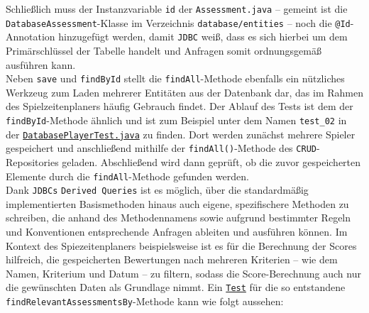 Schließlich muss der Instanzvariable \texttt{id} der 
\texttt{Assessment.java} -- gemeint ist die \linebreak \texttt{DatabaseAssessment}-Klasse 
im Verzeichnis \texttt{database/entities} -- noch die \texttt{@Id}-Annotation hinzugefügt 
werden, damit \texttt{JDBC} weiß, dass es sich hierbei um dem Primärschlüssel der 
Tabelle handelt und Anfragen somit ordnungsgemäß ausführen kann. \\ 
Neben \texttt{save} und \texttt{findById} stellt die \texttt{findAll}-Methode 
ebenfalls ein nützliches Werkzeug zum Laden mehrerer Entitäten aus der Datenbank dar, 
das im Rahmen des Spielzeitenplaners häufig Gebrauch findet. Der Ablauf des Tests 
ist dem der \texttt{findById}-Methode ähnlich und ist zum Beispiel unter dem Namen 
\texttt{test\_02} in der
\href{https://github.com/FlorianOhmes/bat_spielzeitenplaner/blob/main/spielzeitenplaner/src/test/java/de/bathesis/spielzeitenplaner/database/DatabasePlayerTest.java}{\texttt{DatabasePlayerTest.java}}
zu finden. Dort werden zunächst mehrere Spieler gespeichert und anschließend 
mithilfe der \texttt{findAll()}-Methode des \texttt{CRUD}-Repositories geladen. 
Abschließend wird dann geprüft, ob die zuvor gespeicherten Elemente durch die 
\texttt{findAll}-Methode gefunden werden. \\ 
Dank \texttt{JDBCs} \texttt{Derived Queries} ist es möglich, über die standardmäßig 
implementierten Basismethoden hinaus auch eigene, spezifischere Methoden zu schreiben, 
die anhand des Methodennamens sowie aufgrund bestimmter Regeln und Konventionen 
entsprechende Anfragen ableiten und ausführen können. Im Kontext des 
Spiezeitenplaners beispielsweise ist es für die Berechnung der Scores hilfreich, 
die gespeicherten Bewertungen nach mehreren Kriterien -- wie dem Namen, Kriterium 
und Datum -- zu filtern, sodass die Score-Berechnung auch nur die gewünschten Daten 
als Grundlage nimmt. Ein 
\href{https://github.com/FlorianOhmes/bat_spielzeitenplaner/blob/main/spielzeitenplaner/src/test/java/de/bathesis/spielzeitenplaner/database/DatabaseAssessmentTest.java}{\texttt{Test}} 
für die so entstandene \texttt{findRelevantAssessmentsBy}-Methode kann 
wie folgt aussehen: 

